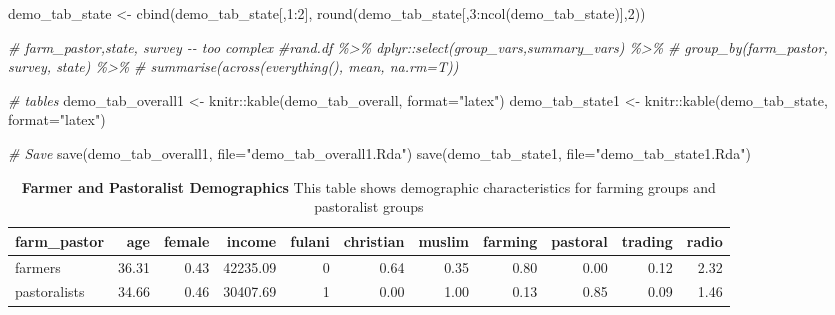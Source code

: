 \documentclass[
]{article}
\newenvironment{Shaded}{\begin{snugshade}}{\end{snugshade}}
\newcommand{\AttributeTok}[1]{\textcolor[rgb]{0.77,0.63,0.00}{#1}}
\newcommand{\CommentTok}[1]{\textcolor[rgb]{0.56,0.35,0.01}{\textit{#1}}}
\newcommand{\DecValTok}[1]{\textcolor[rgb]{0.00,0.00,0.81}{#1}}
\newcommand{\FunctionTok}[1]{\textcolor[rgb]{0.00,0.00,0.00}{#1}}
\newcommand{\NormalTok}[1]{#1}
\newcommand{\OtherTok}[1]{\textcolor[rgb]{0.56,0.35,0.01}{#1}}
\newcommand{\SpecialCharTok}[1]{\textcolor[rgb]{0.00,0.00,0.00}{#1}}
\newcommand{\StringTok}[1]{\textcolor[rgb]{0.31,0.60,0.02}{#1}}
\begin{document}
\begin{Shaded}
\begin{Highlighting}[]
\NormalTok{demo\_tab\_state }\OtherTok{\textless{}{-}} \FunctionTok{cbind}\NormalTok{(demo\_tab\_state[,}\DecValTok{1}\SpecialCharTok{:}\DecValTok{2}\NormalTok{], }\FunctionTok{round}\NormalTok{(demo\_tab\_state[,}\DecValTok{3}\SpecialCharTok{:}\FunctionTok{ncol}\NormalTok{(demo\_tab\_state)],}\DecValTok{2}\NormalTok{))}

\CommentTok{\# farm\_pastor,state, survey {-}{-} too complex}
\CommentTok{\#rand.df \%\textgreater{}\% dplyr::select(group\_vars,summary\_vars) \%\textgreater{}\%}
\CommentTok{\#  group\_by(farm\_pastor, survey, state) \%\textgreater{}\%}
\CommentTok{\#  summarise(across(everything(), mean, na.rm=T))}

\CommentTok{\# tables}
\NormalTok{demo\_tab\_overall1 }\OtherTok{\textless{}{-}}\NormalTok{ knitr}\SpecialCharTok{::}\FunctionTok{kable}\NormalTok{(demo\_tab\_overall, }\AttributeTok{format=}\StringTok{"latex"}\NormalTok{)}
\NormalTok{demo\_tab\_state1 }\OtherTok{\textless{}{-}}\NormalTok{ knitr}\SpecialCharTok{::}\FunctionTok{kable}\NormalTok{(demo\_tab\_state, }\AttributeTok{format=}\StringTok{"latex"}\NormalTok{)}

\CommentTok{\# Save}
\FunctionTok{save}\NormalTok{(demo\_tab\_overall1, }\AttributeTok{file=}\StringTok{"demo\_tab\_overall1.Rda"}\NormalTok{)}
\FunctionTok{save}\NormalTok{(demo\_tab\_state1, }\AttributeTok{file=}\StringTok{"demo\_tab\_state1.Rda"}\NormalTok{)}
\end{Highlighting}
\end{Shaded}

\begin{table}[H]
\begin{center}
\label{tab:demo_tab_overall1}
\caption{\textbf{Farmer and Pastoralist Demographics} This table shows demographic characteristics for farming groups and pastoralist groups}
\smallskip

\begin{tabular}{l|r|r|r|r|r|r|r|r|r|r}
\hline
farm\_pastor & age & female & income & fulani & christian & muslim & farming & pastoral & trading & radio\\
\hline
farmers & 36.31 & 0.43 & 42235.09 & 0 & 0.64 & 0.35 & 0.80 & 0.00 & 0.12 & 2.32\\
\hline
pastoralists & 34.66 & 0.46 & 30407.69 & 1 & 0.00 & 1.00 & 0.13 & 0.85 & 0.09 & 1.46\\
\hline
\end{tabular}


\end{center}
\end{table}
\end{document}
